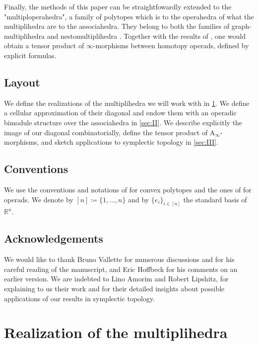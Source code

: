 \documentclass[twoside, 12pt]{amsart}
\theoremstyle{remark}
\newcommand{\RR}{\mathbb{R}}
\begin{document}
\medskip

Finally, the methods of this paper can be straightfowardly extended to the "multiploperahedra", a family of polytopes which is to the operahedra of \cite{LA21} what the multiplihedra are to the associahedra. 
They belong to both the families of graph-multiplihedra \cite{DevadossForcey08} and nestomultiplihedra \cite{AD13}.  
Together with the results of \cite{LA21}, one would obtain a tensor product of $\infty$-morphisms between homotopy operads, defined by explicit formulas. 

\subsection*{Layout} 
We define the realizations of the multiplihedra we will work with in \cref{sec:I}. 
We define a cellular approximation of their diagonal and endow them with an operadic bimodule structure over the associahedra in \cref{sec:II}.
We describe explicitly the image of our diagonal combinatorially, define the tensor product of $\mathrm{A}_\infty$-morphisms, and sketch applications to symplectic topology in \cref{sec:III}. 

\subsection*{Conventions} We use the conventions and notations of \cite{Ziegler95} for convex polytopes and the ones of \cite{LodayVallette12} for operads. We denote by $[n]\coloneqq \{1,\ldots,n\}$ and by $\{ e_i\}_{i \in [n]}$ the standard basis of $\RR^n$.

\subsection*{Acknowledgements} 
We would like to thank Bruno Vallette for numerous discussions and for his careful reading of the manuscript, and Eric Hoffbeck for his comments on an earlier version.
We are indebted to Lino Amorim and Robert Lipshitz, for explaining to us their work and for their detailed insights about possible applications of our results in symplectic topology.



\section{Realization of the multiplihedra} 
\label{sec:I}
\end{document}
